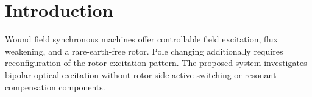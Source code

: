 \begin{abstract}
This work studies a pole-changing wound field synchronous machine supplied by bipolar optical power transfer (OPT) field excitation. The proposed architecture uses stationary optical selection to reverse selected rotor field-coil currents. The design couples the photovoltaic maximum power point to field resistance and rotor magnetomotive force. Electromagnetic and thermal validation remains to be completed and reconciled with the supplied draft.
\end{abstract}
\section{Introduction}
Wound field synchronous machines offer controllable field excitation, flux weakening, and a rare-earth-free rotor. Pole changing additionally requires reconfiguration of the rotor excitation pattern. The proposed system investigates bipolar optical excitation without rotor-side active switching or resonant compensation components.
